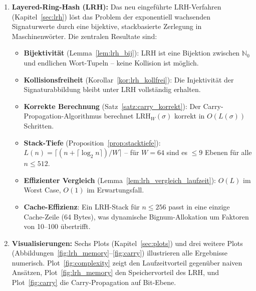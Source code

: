 ﻿\documentclass[a4paper,12pt]{article}
\theoremstyle{definition}
\begin{document}
\begin{enumerate}
  \item \textbf{Layered-Ring-Hash (LRH):} Das neu eingeführte LRH-Verfahren
        (Kapitel~\ref{sec:lrh}) löst das Problem der exponentiell wachsenden
        Signaturwerte durch eine bijektive, stackbasierte Zerlegung in
        Maschinenwörter. Die zentralen Resultate sind:
        \begin{itemize}
          \item \textbf{Bijektivität} (Lemma~\ref{lem:lrh_bij}): LRH ist eine
                Bijektion zwischen $\mathbb{N}_0$ und endlichen Wort-Tupeln -- keine
                Kollision ist möglich.
          \item \textbf{Kollisionsfreiheit} (Korollar~\ref{kor:lrh_kollfrei}):
                Die Injektivität der Signaturabbildung bleibt unter LRH vollständig
                erhalten.
          \item \textbf{Korrekte Berechnung} (Satz~\ref{satz:carry_korrekt}): Der
                Carry-Propagation-Algorithmus berechnet $\mathrm{LRH}_W(\sigma)$
                korrekt in $O(L(\sigma))$ Schritten.
          \item \textbf{Stack-Tiefe} (Proposition~\ref{prop:stacktiefe}):
                $L(n) = \lceil (n + \lceil \log_2 n \rceil) / W \rceil$ -- für
                $W=64$ sind es $\leq 9$ Ebenen für alle $n \leq 512$.
          \item \textbf{Effizienter Vergleich} (Lemma~\ref{lem:lrh_vergleich_laufzeit}):
                $O(L)$ im Worst Case, $O(1)$ im Erwartungsfall.
          \item \textbf{Cache-Effizienz}: Ein LRH-Stack für $n \leq 256$ passt in
                eine einzige Cache-Zeile (64 Bytes), was dynamische Bignum-Allokation
                um Faktoren von 10--100 übertrifft.
        \end{itemize}

  \item \textbf{Visualisierungen:} Sechs Plots (Kapitel~\ref{sec:plots}) und drei
        weitere Plots (Abbildungen~\ref{fig:lrh_memory}--\ref{fig:carry}) illustrieren
        alle Ergebnisse numerisch. Plot~\ref{fig:complexity} zeigt den
        Laufzeitvorteil gegenüber naiven Ansätzen, Plot~\ref{fig:lrh_memory} den
        Speichervorteil des LRH, und Plot~\ref{fig:carry} die Carry-Propagation
        auf Bit-Ebene.
\end{enumerate}

\end{document}
